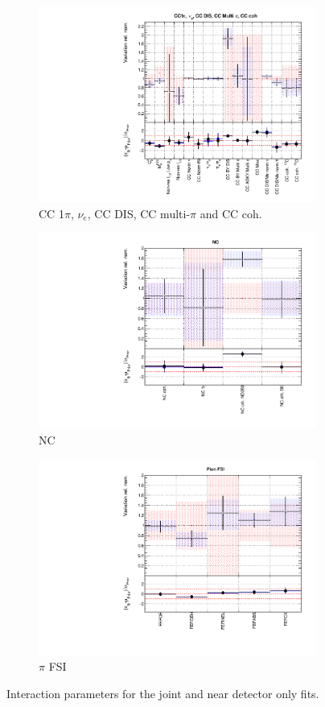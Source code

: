 \begin{figure}[!htbp]
\begin{subfigure}{0.49\textwidth}
  \centering
  \includegraphics[width=0.9\linewidth]{figs/jointxsec3}
  \caption{CC 1$\pi$, $\nu_e$, CC DIS, CC multi-$\pi$ and CC coh.}
\end{subfigure}
\begin{subfigure}{0.45\textwidth}
  \centering
  \includegraphics[width=0.9\linewidth]{figs/jointxsec4}
  \caption{NC}
\end{subfigure}
\begin{subfigure}{0.49\textwidth}
  \centering
  \includegraphics[width=0.9\linewidth]{figs/jointxsec5}
  \caption{$\pi$ FSI}
\end{subfigure}
\caption{Interaction parameters for the joint and near detector only fits.}
\label{fig:jointxsecapp}
\end{figure}

\newpage 
